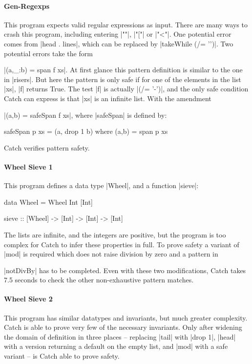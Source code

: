 \paragraph{Gen-Regexps}

This program expects valid regular expressions as input. There are many ways to crash this program, including entering |""|, |"["| or |"<"|. One potential error comes from |head . lines|, which can be replaced by |takeWhile (/= '\n')|. Two potential errors take the form \ignore|(a,_:b) = span f xs|. At first glance this pattern definition is similar to the one in |risers|. But here the pattern is only safe if for one of the elements in the list |xs|, |f| returns True. The test |f| is actually |(/= '-')|, and the only safe condition Catch can express is that |xs| is an infinite list. With the amendment  \ignore|(a,b) = safeSpan f xs|, where |safeSpan| is defined by:

\begin{code}
safeSpan p xs = (a, drop 1 b) where (a,b) = span p xs
\end{code}

\noindent Catch verifies pattern safety.

\paragraph{Wheel Sieve 1}

This program defines a data type |Wheel|, and a function |sieve|:

\pagebreak[3]
\begin{code}
data Wheel = Wheel Int [Int]

sieve :: [Wheel] -> [Int] -> [Int] -> [Int]
\end{code}

The lists are infinite, and the integers are positive, but the program is too complex for Catch to infer these properties in full. To prove safety a variant of |mod| is required which does not raise division by zero and a pattern in \ignore|notDivBy| has to be completed. Even with these two modifications, Catch takes 7.5 seconds to check the other non-exhaustive pattern matches.


\paragraph{Wheel Sieve 2}

This program has similar datatypes and invariants, but much greater complexity. Catch is able to prove very few of the necessary invariants. Only after widening the domain of definition in three places -- replacing |tail| with |drop 1|, |head| with a version returning a default on the empty list, and |mod| with a safe variant -- is Catch able to prove safety.


